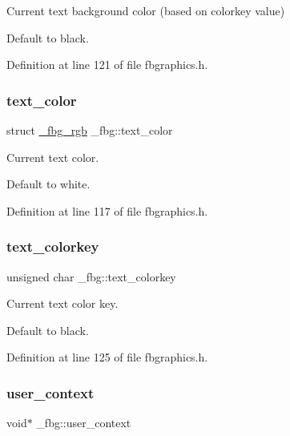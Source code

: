 Current text background color (based on colorkey value) 

Default to black. 

Definition at line 121 of file fbgraphics.\+h.

\mbox{\label{struct__fbg_a4abb858439598b09790ec6d5d8326bb2}} 
\subsubsection{\texorpdfstring{text\+\_\+color}{text\_color}}
{\footnotesize\ttfamily struct \mbox{\hyperlink{fbgraphics_8h_struct__fbg__rgb}{\+\_\+fbg\+\_\+rgb}} \+\_\+fbg\+::text\+\_\+color}



Current text color. 

Default to white. 

Definition at line 117 of file fbgraphics.\+h.

\mbox{\label{struct__fbg_a06e65293cf0b48e70d76d63f5de453e6}} 
\subsubsection{\texorpdfstring{text\+\_\+colorkey}{text\_colorkey}}
{\footnotesize\ttfamily unsigned char \+\_\+fbg\+::text\+\_\+colorkey}



Current text color key. 

Default to black. 

Definition at line 125 of file fbgraphics.\+h.

\mbox{\label{struct__fbg_ae3ecac18abee9dedabacaca9bb063bde}} 
\subsubsection{\texorpdfstring{user\+\_\+context}{user\_context}}
{\footnotesize\ttfamily void$\ast$ \+\_\+fbg\+::user\+\_\+context}



